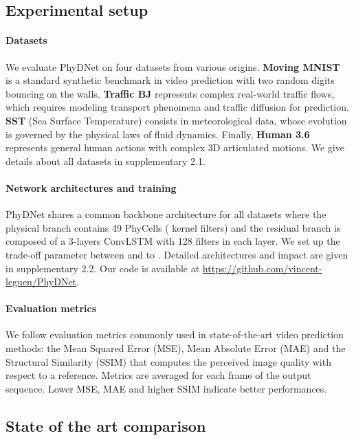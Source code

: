 \documentclass[10pt,twocolumn,letterpaper]{article}
\begin{document}
\subsection{Experimental setup}

\paragraph{Datasets}  We evaluate PhyDNet on four datasets from various origins. \textbf{Moving MNIST}~\cite{srivastava2015unsupervised} is a standard synthetic benchmark in video prediction with two random digits bouncing on the walls. \textbf{Traffic BJ} \cite{zhang2017deep} represents complex real-world traffic flows, which requires modeling transport phenomena and traffic diffusion for prediction. \textbf{SST} (Sea Surface Temperature) \cite{de2017deep} consists in meteorological data, whose evolution is governed by the physical laws of fluid dynamics. Finally, \textbf{Human 3.6} \cite{ionescu2013human3} represents general human actions with complex 3D articulated motions. We give details about all datasets in supplementary 2.1.

\paragraph{Network architectures and training}
PhyDNet shares a common backbone architecture for all datasets where the physical branch contains 49 PhyCells ( kernel filters) and the residual branch is composed of a 3-layers ConvLSTM with 128 filters in each layer. We set up the trade-off parameter between  and  to . Detailed architectures and  impact are given in supplementary 2.2. Our code is available at \url{https://github.com/vincent-leguen/PhyDNet}.  \vspace{-0.4cm}

\paragraph{Evaluation metrics} We follow evaluation metrics commonly used in state-of-the-art video prediction methods: the Mean Squared Error (MSE), Mean Absolute Error (MAE) and the Structural Similarity (SSIM) \cite{wang2004image} that computes the perceived image quality with respect to a reference. Metrics are averaged for each frame of the output sequence. Lower MSE, MAE and higher SSIM indicate better performances.


\subsection{State of the art comparison}
\end{document}
